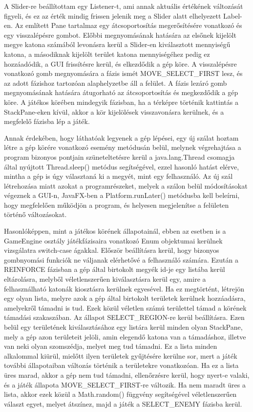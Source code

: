 A Slider-re beállítottam egy Listener-t, ami annak aktuális értékének változását figyeli, és ez az érték mindig frissen jelenik meg a Slider alatt elhelyezett Label-en. Az említett Pane tartalmaz egy átcsoportosítás megerősítésére vonatkozó és egy visszalépésre gombot. Előbbi megnyomásának hatására az elsőnek kijelölt megye katona számából levonásra kerül a Slider-en kiválasztott mennyiségű katona, a másodiknak kijelölt terület katona mennyiségéhez pedig ez hozzáadódik, a GUI frissítésre kerül, és elkezdődik a gép köre. A visszalépésre vonatkozó gomb megnyomására a fázis ismét MOVE\_SELECT\_FIRST lesz, és az adott fázishoz tartozóan alaphelyzetbe áll a felület. A fázis lezáró gomb megnyomásának hatására átugorható az átcsoportosítás és megkezdődik a gép köre. A játékos körében mindegyik fázisban, ha a térképre történik kattintás a StackPane-eken kívül, akkor a kör kijelölések visszavonásra kerülnek, és a megfelelő fázisba lép a játék. 

Annak érdekében, hogy láthatóak legyenek a gép lépései, egy új szálat hoztam létre a gép körére vonatkozó esemény metódusán belül, melynek végrehajtása a program bizonyos pontjain szüneteltetésre kerül a java.lang.Thread csomagja által nyújtott Thread.sleep() metódus segítségével, ezzel hasonló hatást elérve, mintha a gép is úgy választaná ki a megyét, mint egy felhasználó. Az új szál létrehozása miatt azokat a programrészeket, melyek a szálon belül módosításokat végeznek a GUI-n, JavaFX-ben a Platform.runLater() metódusba kell beleírni, hogy megfelelően működjön a program, és helyesen megjelenítse a felületen történő változásokat. 

Hasonlóképpen, mint a játékos körének állapotainál, ebben az esetben is a GameEngine osztály játékfázisaira vonatkozó Enum objektumai kerülnek vizsgálatra switch-case ágakkal. Először beállításra kerül, hogy bizonyos gombnyomási funkciók ne váljanak elérhetővé a felhasználó számára. Ezután a REINFORCE fázisban a gép által birtokolt megyék id-je egy listába kerül eltárolásra, melyből véletlenszerűen kiválasztásra kerül egy, amire a felhasználható katonák kiosztásra kerülnek egyesével. Ha ez megtörtént, létrejön egy olyan lista, melyre azok a gép által birtokolt területek kerülnek hozzáadásra, amelyekről támadni is tud. Ezek közül véletlen számú területtel támad a körének támadási szakaszában. Az állapot SELECT\_REGION-re kerül beállításra. Ezen belül egy területének kiválasztásához egy listára kerül minden olyan StackPane, mely a gép azon területeit jelöli, amin elegendő katona van a támadáshoz, illetve van neki olyan szomszédja, melyet meg tud támadni. Ez a lista minden alkalommal kiürül, mielőtt ilyen területek gyűjtésére kerülne sor, mert a játék további állapotaiban változás történik a területekre vonatkozóan. Ha ez a lista üres marad, akkor a gép nem tud támadni, ellenőrzésre kerül, hogy nyert-e valaki, és a játék állapota MOVE\_SELECT\_FIRST-re változik. Ha nem maradt üres a lista, akkor ezek közül a Math.random() függvény segítségével véletlenszerűen választ egyet, melyet átszínez, majd a játék a SELECT\_ENEMY fázisba kerül. 

